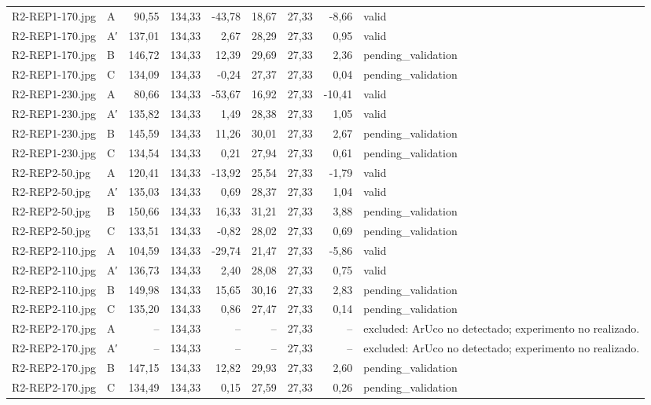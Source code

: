 \begin{scriptsize}
\begin{longtable}{@{}llrrrrrrl@{}}
R2-REP1-170.jpg & A & 90,55 & 134,33 & -43,78 & 18,67 & 27,33 & -8,66 & valid \\
R2-REP1-170.jpg & A′ & 137,01 & 134,33 & 2,67 & 28,29 & 27,33 & 0,95 & valid \\
R2-REP1-170.jpg & B & 146,72 & 134,33 & 12,39 & 29,69 & 27,33 & 2,36 & pending\_validation \\
R2-REP1-170.jpg & C & 134,09 & 134,33 & -0,24 & 27,37 & 27,33 & 0,04 & pending\_validation \\
R2-REP1-230.jpg & A & 80,66 & 134,33 & -53,67 & 16,92 & 27,33 & -10,41 & valid \\
R2-REP1-230.jpg & A′ & 135,82 & 134,33 & 1,49 & 28,38 & 27,33 & 1,05 & valid \\
R2-REP1-230.jpg & B & 145,59 & 134,33 & 11,26 & 30,01 & 27,33 & 2,67 & pending\_validation \\
R2-REP1-230.jpg & C & 134,54 & 134,33 & 0,21 & 27,94 & 27,33 & 0,61 & pending\_validation \\
R2-REP2-50.jpg & A & 120,41 & 134,33 & -13,92 & 25,54 & 27,33 & -1,79 & valid \\
R2-REP2-50.jpg & A′ & 135,03 & 134,33 & 0,69 & 28,37 & 27,33 & 1,04 & valid \\
R2-REP2-50.jpg & B & 150,66 & 134,33 & 16,33 & 31,21 & 27,33 & 3,88 & pending\_validation \\
R2-REP2-50.jpg & C & 133,51 & 134,33 & -0,82 & 28,02 & 27,33 & 0,69 & pending\_validation \\
R2-REP2-110.jpg & A & 104,59 & 134,33 & -29,74 & 21,47 & 27,33 & -5,86 & valid \\
R2-REP2-110.jpg & A′ & 136,73 & 134,33 & 2,40 & 28,08 & 27,33 & 0,75 & valid \\
R2-REP2-110.jpg & B & 149,98 & 134,33 & 15,65 & 30,16 & 27,33 & 2,83 & pending\_validation \\
R2-REP2-110.jpg & C & 135,20 & 134,33 & 0,86 & 27,47 & 27,33 & 0,14 & pending\_validation \\
R2-REP2-170.jpg & A & -- & 134,33 & -- & -- & 27,33 & -- & excluded: ArUco no detectado; experimento no realizado. \\
R2-REP2-170.jpg & A′ & -- & 134,33 & -- & -- & 27,33 & -- & excluded: ArUco no detectado; experimento no realizado. \\
R2-REP2-170.jpg & B & 147,15 & 134,33 & 12,82 & 29,93 & 27,33 & 2,60 & pending\_validation \\
R2-REP2-170.jpg & C & 134,49 & 134,33 & 0,15 & 27,59 & 27,33 & 0,26 & pending\_validation \\

\end{longtable}
\end{scriptsize}
